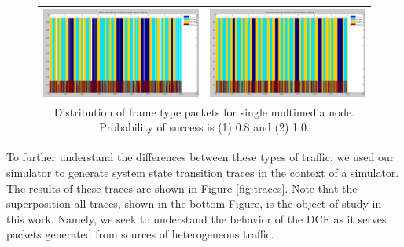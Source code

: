 \documentclass{llncs}
\begin{document}
\begin{figure}
\begin{center}
\begin{tabular}{cc}
\includegraphics[scale=0.2]{single_mm_pSucc08.png} & \includegraphics[scale=0.2]{single_mm_pSucc10.png} \\
\multicolumn{2}{c}{Distribution of frame type packets for single multimedia node. Probability of success is (1) 0.8 and (2) 1.0.}
\end{tabular}
\end{center}
\label{fig:single_node_mm2}
\end{figure}

To further understand the differences between these types of traffic, we used our simulator to generate system state transition traces in the context of a simulator. The results of these traces are shown in Figure \ref{fig:traces}. Note that the superposition all traces, shown in the bottom Figure, is the object of study in this work. Namely, we seek to understand the behavior of the DCF as it serves packets generated from sources of heterogeneous traffic.
\end{document}
